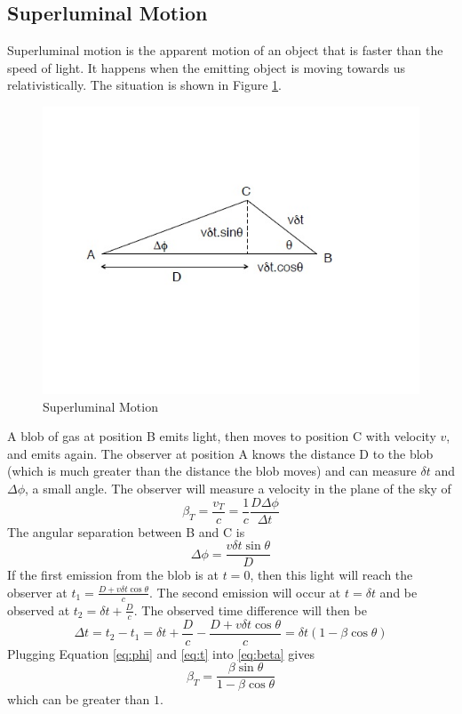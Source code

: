 \subsection{Superluminal Motion}
Superluminal motion is the apparent motion of an object that is faster than 
the speed of light.  It happens when the emitting object is moving towards 
us relativistically.  The situation is shown in Figure \ref{fig:slum}.

\begin{figure}[!h]
\begin{center}
\includegraphics[width=\textwidth]{slum.jpg}
\end{center}
\caption{Superluminal Motion
\label{fig:slum}}
\end{figure}

A blob of gas at position B emits light, then moves to position C with 
velocity $v$, and emits again.  The observer at position A knows the distance 
D to the blob (which is much greater than the distance the blob moves) and 
can measure $\delta t$ and $\Delta\phi$, a small angle.  The observer will 
measure a velocity in the plane of the sky of 
\begin{equation}\label{eq:beta}
\beta_T=\frac{v_T}{c}=\frac{1}{c}\frac{D\Delta\phi}{\Delta t}
\end{equation}
The angular separation between B and C is 
\begin{equation}\label{eq:phi}
\Delta\phi=\frac{v\delta t\sin\theta}{D}
\end{equation}
If the first emission from the blob is at $t=0$, then this light will 
reach the observer at $t_1=\frac{D+v\delta t\cos\theta}{c}$.  The second 
emission will occur at $t=\delta t$ and be observed at 
$t_2=\delta t+\frac{D}{c}$.  The observed time difference will then be
\begin{equation}\label{eq:t}
\Delta t=t_2-t_1=\delta t+\frac{D}{c}-\frac{D+v\delta t\cos\theta}{c}
=\delta t(1-\beta\cos\theta)
\end{equation}
Plugging Equation \ref{eq:phi} and \ref{eq:t} into \ref{eq:beta} gives 
\begin{equation}
\beta_T=\frac{\beta\sin\theta}{1-\beta\cos\theta}
\end{equation}
which can be greater than $1$.

